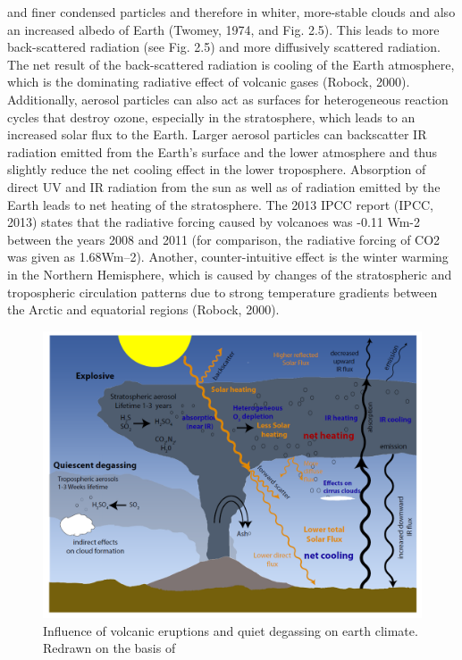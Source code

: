 \documentclass  [
  paper    = a4,
  BCOR     = 10mm,
  twoside,
  fontsize = 12pt,
  fleqn,
  toc      = bibnumbered,
  toc      = listofnumbered,
  numbers  = noendperiod,
  headings = normal,
  listof   = leveldown,
  version  = 3.03
]                                       {scrreprt}
\begin{document}
{	and finer condensed particles and therefore in whiter, more-stable clouds and
	also an increased albedo of Earth (Twomey, 1974, and Fig. 2.5). This leads
	to more back-scattered radiation (see Fig. 2.5) and more diffusively scattered radiation. The net result of the back-scattered radiation is cooling of the Earth
	atmosphere, which is the dominating radiative effect of volcanic gases (Robock,
	2000). Additionally, aerosol particles can also act as surfaces for heterogeneous
	reaction cycles that destroy ozone, especially in the stratosphere, which leads to
	an increased solar flux to the Earth. Larger aerosol particles can backscatter IR
	radiation emitted from the Earth’s surface and the lower atmosphere and thus
	slightly reduce the net cooling effect in the lower troposphere. Absorption of
	direct UV and IR radiation from the sun as well as of radiation emitted by the
	Earth leads to net heating of the stratosphere. The 2013 IPCC report (IPCC,
	2013) states that the radiative forcing caused by volcanoes was -0.11 Wm-2
	between the years 2008 and 2011 (for comparison, the radiative forcing of CO2
	was given as 1.68Wm–2). Another, counter-intuitive effect is the winter warming
	in the Northern Hemisphere, which is caused by changes of the stratospheric and
	tropospheric circulation patterns due to strong temperature gradients between
	the Arctic and equatorial regions (Robock, 2000).
	\begin{figure}
		\centering
		\includegraphics[width=0.7\linewidth]{Bilder/Simon/Bilder_Tung/Climate_Influence}
		\caption{Influence of volcanic eruptions and quiet degassing on earth climate. Redrawn on the basis of \cite{robock2000volcanic}}
		\label{fig:climateinfluence}
	\end{figure}
}
\end{document}
